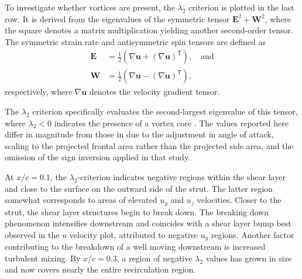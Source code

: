 \documentclass[wes, manuscript]{copernicus}
\begin{document}
To investigate whether vortices are present, the $\lambda_{2}$ criterion is plotted in the last row. It is derived from the eigenvalues of the symmetric tensor $\mathbf{E}^{2} + \mathbf{W}^{2}$, where the square denotes a matrix multiplication yielding another second-order tensor. The symmetric strain rate and antisymmetric spin tensors are defined as
\begin{align}
    \mathbf{E} & = \frac{1}{2} \left( \nabla \mathbf{u} + \left( \nabla \mathbf{u} \right)^{\mathsf{T}} \right) , \quad \text{and} \\
    \mathbf{W} & = \frac{1}{2} \left( \nabla \mathbf{u} - \left( \nabla \mathbf{u} \right)^{\mathsf{T}} \right) ,
\end{align}
respectively, where $\nabla \mathbf{u}$ denotes the velocity gradient tensor.

The $\lambda_2$ criterion specifically evaluates the second-largest eigenvalue of this tensor, where $\lambda_2 < 0$ indicates the presence of a vortex core \citep{Jeong1995}. The values reported here differ in magnitude from those in \cite{Vire2022} due to the adjustment in angle of attack, scaling to the projected frontal area rather than the projected side area, and the omission of the sign inversion applied in that study.

At $x/c = 0.1$, the $\lambda_2$-criterion indicates negative regions within the shear layer and close to the surface on the outward side of the strut. The latter region somewhat corresponds to areas of elevated $u_{y}$ and $u_{z}$ velocities. Closer to the strut, the shear layer structures begin to break down. The breaking down phenomenon intensifies downstream and coincides with a shear layer bump best observed in the $u$ velocity plot, attributed to negative $u_{y}$ regions. Another factor contributing to the breakdown of a well moving downstream is increased turbulent mixing. By $x/c = 0.3$, a region of negative $\lambda_2$ values has grown in size and now covers nearly the entire recirculation region.
\end{document}
